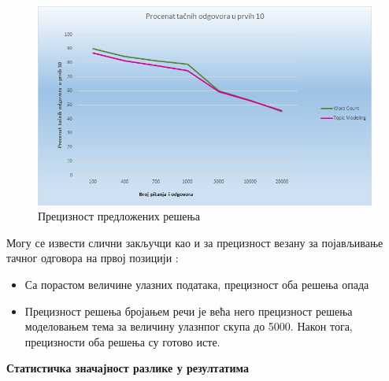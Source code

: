 \begin{figure}[H]
  \centering
   \includegraphics[scale=0.8]{./Slike/procenat10.png} 
	\caption{Прецизност предложених решења}
	\label{fig:slika1}
\end{figure}

Могу се извести слични закључци као и за прецизност везану за појављивање тачног одговора на првој позицији :

\begin{itemize}
\item Са порастом величине улазних података, прецизност оба решења опада
\item Прецизност решења бројањем речи је већа него прецизност решења моделовањем тема за величину улазнпог скупа до 5000. Након тога, прецизности оба решења су готово исте.
\end{itemize}


\textbf{Статистичка значајност разлике у резултатима}\\

